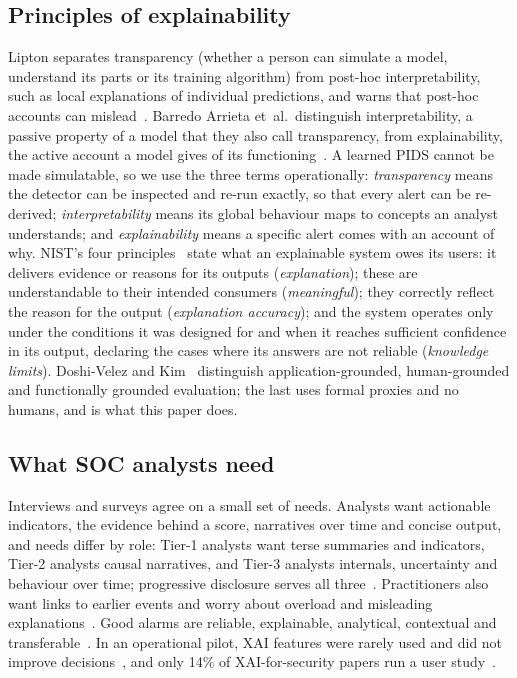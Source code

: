 \documentclass[conference]{IEEEtran}
\begin{document}
\subsection{Principles of explainability}
Lipton separates transparency (whether a person can simulate a model, understand its parts or its
training algorithm) from post-hoc interpretability, such as local explanations of individual predictions,
and warns that post-hoc accounts can mislead~\cite{lipton}. Barredo Arrieta et~al.\ distinguish
interpretability, a passive property of a model that they also call transparency, from explainability,
the active account a model gives of its functioning~\cite{arrieta}. A learned PIDS cannot be made
simulatable, so we use the three terms operationally: \emph{transparency} means the detector can be
inspected and re-run exactly, so that every alert can be re-derived; \emph{interpretability} means its
global behaviour maps to concepts an analyst understands; and \emph{explainability} means a specific
alert comes with an account of why. NIST's four
principles~\cite{nist} state what an explainable system owes its users: it delivers evidence or reasons
for its outputs (\emph{explanation}); these are understandable to their intended consumers
(\emph{meaningful}); they correctly reflect the reason for the output (\emph{explanation accuracy});
and the system operates only under the conditions it was designed for and when it reaches sufficient
confidence in its output, declaring the cases where its answers are not reliable (\emph{knowledge limits}). Doshi-Velez and Kim~\cite{doshivelez} distinguish application-grounded,
human-grounded and functionally grounded evaluation; the last uses formal proxies and no humans, and is
what this paper does.

\subsection{What SOC analysts need}
Interviews and surveys agree on a small set of needs. Analysts want actionable indicators, the evidence
behind a score, narratives over time and concise output, and needs differ by role: Tier-1 analysts want
terse summaries and indicators, Tier-2 analysts causal narratives, and Tier-3 analysts internals,
uncertainty and behaviour over time; progressive disclosure serves all three~\cite{tmt}. Practitioners
also want links to earlier events and worry about overload and misleading explanations~\cite{mink}.
Good alarms are reliable, explainable, analytical, contextual and transferable~\cite{alahmadi}. In an
operational pilot, XAI features were rarely used and did not improve decisions~\cite{nyreyu}, and only
14\% of XAI-for-security papers run a user study~\cite{nadeem}.
\end{document}

